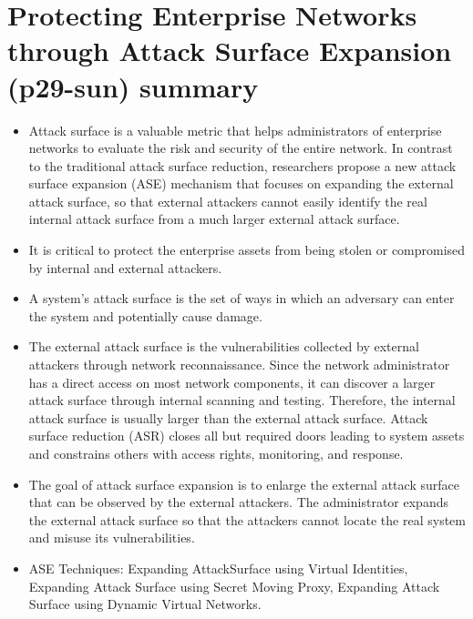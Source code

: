 \documentclass[14pt]{article}
\begin{document}
	\section{Protecting Enterprise Networks through Attack Surface Expansion (p29-sun) summary}
	\begin{itemize}
	\item Attack surface is a valuable metric that helps administrators of enterprise networks to evaluate the risk and security of the entire network. In contrast to the traditional attack surface reduction, researchers propose a new attack surface expansion (ASE) mechanism that focuses on expanding the external attack surface, so that external attackers cannot easily identify the real internal attack surface from a much larger external attack surface.
	\item It is critical to protect the enterprise assets from being stolen or compromised by internal and external attackers. 
	\item A system’s attack surface is the set of ways in which an adversary can enter the system and potentially cause damage.
	\item The external attack surface is the vulnerabilities collected by external attackers through network reconnaissance. Since the network administrator has a direct access on most network components, it can discover a larger attack surface through internal scanning and testing. Therefore, the internal attack surface is usually larger than the external attack surface. Attack surface reduction (ASR) closes all but required doors leading to system assets and constrains others with access rights, monitoring, and response. 
	\item The goal of attack surface expansion is to enlarge the external attack surface that can be observed by the external attackers.  The administrator expands the external attack surface so that the attackers cannot locate the real system and misuse its vulnerabilities.
	\item ASE Techniques: Expanding AttackSurface using Virtual Identities, Expanding Attack Surface using Secret Moving Proxy, Expanding Attack Surface using Dynamic Virtual Networks.
	\end{itemize}
\end{document}
